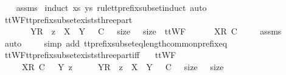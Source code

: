 %
\isadelimproof
\ \ %
\endisadelimproof
%
\isatagproof
{}\isamarkupfalse%
\ assms\ \isamarkupfalse%
{\isacharparenleft}induct\ xs\ ys\ rule{\isacharcolon}tt{\isacharunderscore}prefix{\isacharunderscore}subset{\isachardot}induct{\isacharcomma}\ auto{\isacharparenright}%
\endisatagproof
{\isafoldproof}%
%
\isadelimproof
\isanewline
%
\endisadelimproof
\isanewline
{}\isamarkupfalse%
\ ttWF{\isacharunderscore}tt{\isacharunderscore}prefix{\isacharunderscore}subset{\isacharunderscore}exists{\isacharunderscore}three{\isacharunderscore}part{\isacharprime}{\isacharcolon}\isanewline
\ \ \ {\isachardoublequoteopen}{\isasymsigma}\ {\isacharequal}\ {\isasymrho}\ {\isacharat}\ {\isacharparenleft}{\isacharbrackleft}{\isacharbrackleft}Y{\isacharbrackright}\isactrlsub R{\isacharbrackright}\ {\isacharat}\ z{\isacharparenright}\ {\isasymand}\ X\ {\isasymsubseteq}\ Y\ {\isasymand}\ {\isasymrho}\ {\isasymlesssim}\isactrlsub C\ {\isasymrho}\ {\isasymand}\ size\ {\isasymrho}\ {\isacharequal}\ size\ {\isasymrho}{\isachardoublequoteclose}\ {\isachardoublequoteopen}ttWF\ {\isasymsigma}{\isachardoublequoteclose}\isanewline
\ \ \ {\isachardoublequoteopen}{\isasymrho}\ {\isacharat}\ {\isacharbrackleft}{\isacharbrackleft}X{\isacharbrackright}\isactrlsub R{\isacharbrackright}\ {\isasymlesssim}\isactrlsub C\ {\isasymsigma}{\isachardoublequoteclose}\isanewline
%
\isadelimproof
\ \ %
\endisadelimproof
%
\isatagproof
{}\isamarkupfalse%
\ assms\ \isamarkupfalse%
\ auto\ \isanewline
\ \ \isamarkupfalse%
\ {\isacharparenleft}simp\ add{\isacharcolon}\ tt{\isacharunderscore}prefix{\isacharunderscore}subset{\isacharunderscore}eq{\isacharunderscore}length{\isacharunderscore}common{\isacharunderscore}prefix{\isacharunderscore}eq{\isacharparenright}%
\endisatagproof
{\isafoldproof}%
%
\isadelimproof
\isanewline
%
\endisadelimproof
\isanewline
{}\isamarkupfalse%
\ ttWF{\isacharunderscore}tt{\isacharunderscore}prefix{\isacharunderscore}subset{\isacharunderscore}exists{\isacharunderscore}three{\isacharunderscore}part{\isacharunderscore}iff{\isacharcolon}\isanewline
\ \ \ {\isachardoublequoteopen}ttWF\ {\isasymsigma}{\isachardoublequoteclose}\isanewline
\ \ \ {\isachardoublequoteopen}{\isasymrho}\ {\isacharat}\ {\isacharbrackleft}{\isacharbrackleft}X{\isacharbrackright}\isactrlsub R{\isacharbrackright}\ {\isasymlesssim}\isactrlsub C\ {\isasymsigma}\ {\isacharequal}\ {\isacharparenleft}{\isasymexists}Y\ z\ {\isasymrho}\ {\isasymsigma}\ {\isacharequal}\ {\isasymrho}\ {\isacharat}\ {\isacharparenleft}{\isacharbrackleft}{\isacharbrackleft}Y{\isacharbrackright}\isactrlsub R{\isacharbrackright}\ {\isacharat}\ z{\isacharparenright}\ {\isasymand}\ X\ {\isasymsubseteq}\ Y\ {\isasymand}\ {\isasymrho}\ {\isasymlesssim}\isactrlsub C\ {\isasymrho}\ {\isasymand}\ size\ {\isasymrho}\ {\isacharequal}\ size\ {\isasymrho}{\isacharparenright}{\isachardoublequoteclose}\isanewline
